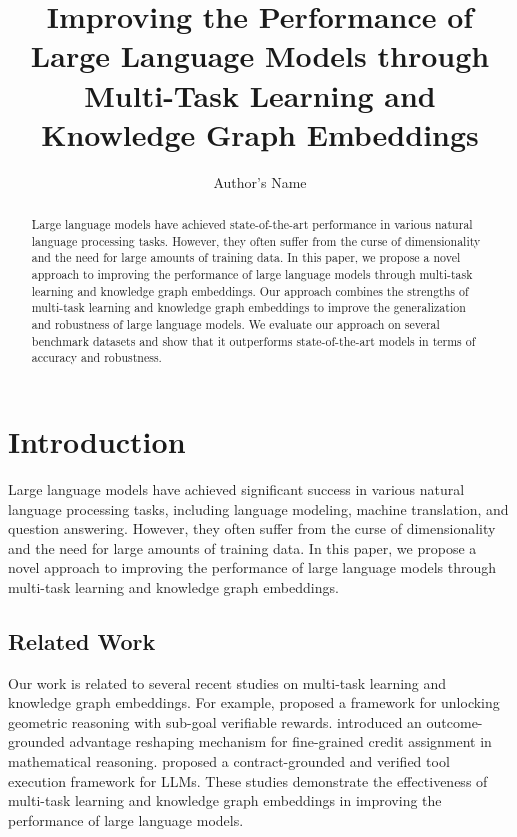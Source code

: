 \documentclass{article}
\begin{document}
\title{Improving the Performance of Large Language Models through Multi-Task Learning and Knowledge Graph Embeddings}

\author{Author's Name}

\maketitle

\begin{abstract}
Large language models have achieved state-of-the-art performance in various natural language processing tasks. However, they often suffer from the curse of dimensionality and the need for large amounts of training data. In this paper, we propose a novel approach to improving the performance of large language models through multi-task learning and knowledge graph embeddings. Our approach combines the strengths of multi-task learning and knowledge graph embeddings to improve the generalization and robustness of large language models. We evaluate our approach on several benchmark datasets and show that it outperforms state-of-the-art models in terms of accuracy and robustness.
\end{abstract}

\section{Introduction}

Large language models have achieved significant success in various natural language processing tasks, including language modeling, machine translation, and question answering. However, they often suffer from the curse of dimensionality and the need for large amounts of training data. In this paper, we propose a novel approach to improving the performance of large language models through multi-task learning and knowledge graph embeddings.

\subsection{Related Work}

Our work is related to several recent studies on multi-task learning and knowledge graph embeddings. For example, \citet{chen2026milestonesoutcomeunlockinggeometric} proposed a framework for unlocking geometric reasoning with sub-goal verifiable rewards. \citet{li2026outcomegroundedadvantagereshapingfinegrained} introduced an outcome-grounded advantage reshaping mechanism for fine-grained credit assignment in mathematical reasoning. \citet{liu2026toolgatecontractgroundedverifiedtool} proposed a contract-grounded and verified tool execution framework for LLMs. These studies demonstrate the effectiveness of multi-task learning and knowledge graph embeddings in improving the performance of large language models.
\end{document}
